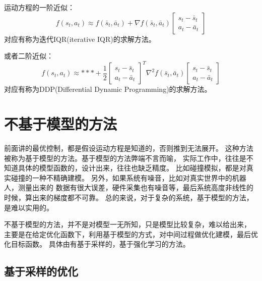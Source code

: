 \documentclass[lang=cn,newtx,10pt,scheme=chinese]{elegantbook}
\begin{document}
运动方程的一阶近似：
\begin{equation}
  f\left(s_t, a_t\right) \approx f\left(\bar{s}_t, \bar{a}_t\right)+\nabla f\left(\bar{s}_t, \bar{a}_t\right)\left[\begin{array}{l}
  s_t-\bar{s}_t \\
  a_t-\bar{a}_t
  \end{array}\right]
\end{equation}
对应有称为迭代IQR(iterative IQR)的求解方法。

或者二阶近似：
\begin{equation}
  f\left(s_t, a_t\right) \approx * * *+\frac{1}{2}\left[\begin{array}{c}
  s_t-\bar{s}_t \\
  a_t-\bar{a}_t
  \end{array}\right]^T \nabla^2 f\left(\bar{s}_t, \bar{a}_t\right)\left[\begin{array}{l}
  s_t-\bar{s}_t \\
  a_t-\bar{a}_t
  \end{array}\right]
\end{equation}
对应有称为DDP(Differential Dynamic Programming)的求解方法。

\section{不基于模型的方法}
前面讲的最优控制，都是假设运动方程是知道的，否则推到无法展开。
这种方法被称为基于模型的方法。基于模型的方法弊端不言而喻，
实际工作中，往往是不知道具体的模型函数的，设计出来，往往也缺乏精度。
比如碰撞模拟，都是对真实碰撞的一种不精确建模。
另外，如果系统有噪音，比如对真实世界中的机器人，测量出来的
数据有很大误差，硬件采集也有噪音等，最后系统高度非线性的时候，算出来的梯度都不可靠。
总的来说，对于复杂的系统，基于模型的方法，是难以实用的。

不基于模型的方法，并不是对模型一无所知，只是模型比较复杂，难以给出来，
主要是在给定优化函数下，利用基于模型的方式，对中间过程做优化建模，最后优化目标函数。
具体由有基于采样的，基于强化学习的方法。

\subsection{基于采样的优化}
\end{document}
